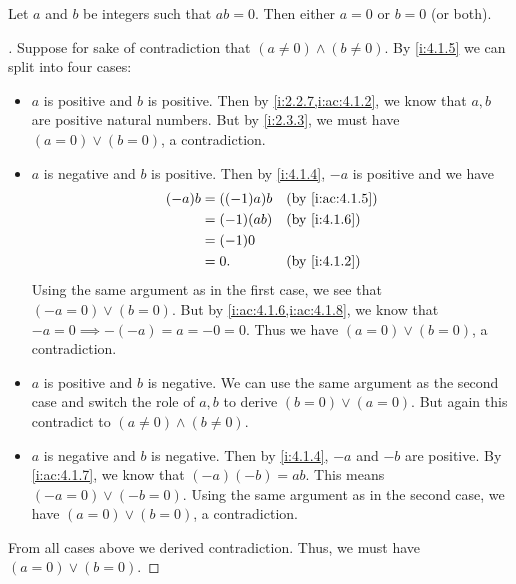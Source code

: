 \begin{prop}\label{i:4.1.8}
  Let \(a\) and \(b\) be integers such that \(ab = 0\).
  Then either \(a = 0\) or \(b = 0\) (or both).
\end{prop}

\begin{proof}[]
  Suppose for sake of contradiction that \((a \neq 0) \land (b \neq 0)\).
  By \cref{i:4.1.5} we can split into four cases:
  \begin{itemize}
    \item \(a\) is positive and \(b\) is positive.
          Then by \cref{i:2.2.7,i:ac:4.1.2}, we know that \(a, b\) are positive natural numbers.
          But by \cref{i:2.3.3}, we must have \((a = 0) \lor (b = 0)\), a contradiction.
    \item \(a\) is negative and \(b\) is positive.
          Then by \cref{i:4.1.4}, \(-a\) is positive and we have
          \begin{align*}
            (-a) b & = ((-1) a) b &  & \by{i:ac:4.1.5} \\
                   & = (-1) (ab)  &  & \by{i:4.1.6}    \\
                   & = (-1) 0                          \\
                   & = 0.         &  & \by{i:4.1.2}
          \end{align*}
          Using the same argument as in the first case, we see that \((-a = 0) \lor (b = 0)\).
          But by \cref{i:ac:4.1.6,i:ac:4.1.8}, we know that \(-a = 0 \implies -(-a) = a = -0 = 0\).
          Thus we have \((a = 0) \lor (b = 0)\), a contradiction.
    \item \(a\) is positive and \(b\) is negative.
          We can use the same argument as the second case and switch the role of \(a, b\) to derive \((b = 0) \lor (a = 0)\).
          But again this contradict to \((a \neq 0) \land (b \neq 0)\).
    \item \(a\) is negative and \(b\) is negative.
          Then by \cref{i:4.1.4}, \(-a\) and \(-b\) are positive.
          By \cref{i:ac:4.1.7}, we know that \((-a)(-b) = ab\).
          This means \((-a = 0) \lor (-b = 0)\).
          Using the same argument as in the second case, we have \((a = 0) \lor (b = 0)\), a contradiction.
  \end{itemize}
  From all cases above we derived contradiction.
  Thus, we must have \((a = 0) \lor (b = 0)\).
\end{proof}

